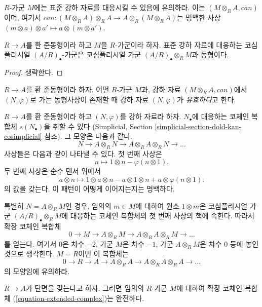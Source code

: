 \noindent
$R$-가군 $M$에는 표준 강하 자료를 대응시킬 수 있음에 유의하라. 이는
$(M \otimes_R A, can)$이며, 여기서
$can : (M \otimes_R A) \otimes_R A \to A \otimes_R (M \otimes_R A)$는
명백한 사상
$(m \otimes a) \otimes a' \mapsto a \otimes (m \otimes a')$.

\begin{lemma}
\label{lemma-canonical-descent-datum-cosimplicial}
$R \to A$를 환 준동형이라 하고 $M$을 $R$-가군이라 하자.
표준 강하 자료에 대응하는 코심플리시얼 $(A/R)_\bullet$-가군은
코심플리시얼 가군 $(A/R)_\bullet \otimes_R M$과 동형이다.
\end{lemma}

\begin{proof}
생략한다.
\end{proof}

\begin{definition}
\label{definition-descent-datum-effective-module}
$R \to A$를 환 준동형이라 하자. 어떤 $R$-가군 $M$과, 강하 자료
$(M \otimes_R A, can)$에서 $(N, \varphi)$로 가는 동형사상이 존재할 때
강하 자료 $(N, \varphi)$가 {\it 유효하다}고 한다.
\end{definition}

\noindent
$R \to A$를 환 준동형이라 하고 $(N, \varphi)$를 강하 자료라 하자.
$N_\bullet$에 대응하는 코체인 복합체 $s(N_\bullet)$을 취할 수 있다
(Simplicial, Section \ref{simplicial-section-dold-kan-cosimplicial} 참조).
그 모양은 다음과 같다.
$$
N \to A \otimes_R N \to A \otimes_R A \otimes_R N \to \ldots
$$
사상들은 다음과 같이 나타낼 수 있다. 첫 번째 사상은
$$
n \longmapsto 1 \otimes n - \varphi(n \otimes 1).
$$
두 번째 사상은 순수 텐서 위에서
$$
a \otimes n \longmapsto 1 \otimes a \otimes n
- a \otimes 1 \otimes n + a \otimes \varphi(n \otimes 1).
$$
의 값을 갖는다. 이 패턴이 어떻게 이어지는지는 명백하다.

\medskip\noindent
특별히 $N = A \otimes_R M$인 경우, 임의의 $m \in M$에 대하여 원소
$1 \otimes m$은 코심플리시얼 가군 $(A/R)_\bullet \otimes_R M$에
대응하는 코체인 복합체의 첫 번째 사상의 핵에 속한다. 따라서 확장 코체인
복합체
\begin{equation}
\label{equation-extended-complex}
0 \to M \to A \otimes_R M \to A \otimes_R A \otimes_R M \to \ldots
\end{equation}
를 얻는다. 여기서 $0$은 차수 $-2$, 가군 $M$은 차수 $-1$, 가군
$A \otimes_R M$은 차수 $0$ 등에 놓인 것으로 생각한다. $M = R$이면
이 복합체는
$$
0 \to R \to A \to A \otimes_R A \to A \otimes_R A \otimes_R A \to \ldots
$$
의 모양임에 유의하라.

\begin{lemma}
\label{lemma-with-section-exact}
$R \to A$가 단면을 갖는다고 하자. 그러면 임의의 $R$-가군 $M$에 대하여
확장 코체인 복합체 (\ref{equation-extended-complex})는 완전하다.
\end{lemma}

